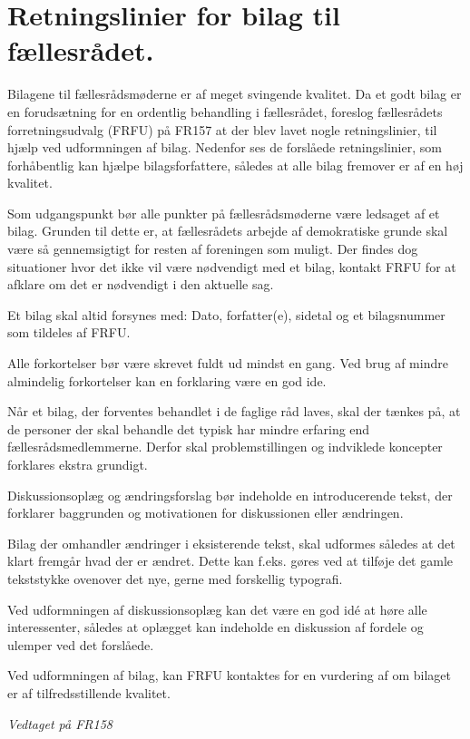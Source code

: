 \section{Retningslinier for bilag til fællesrådet.}

Bilagene til fællesrådsmøderne er af meget svingende kvalitet. Da et godt bilag er en forudsætning for en ordentlig
behandling i fællesrådet, foreslog fællesrådets forretningsudvalg (FRFU) på FR157 at der blev lavet nogle
retningslinier, til hjælp ved udformningen af bilag. Nedenfor ses de forslåede retningslinier, som forhåbentlig kan
hjælpe bilagsforfattere, således at alle bilag fremover er af en høj kvalitet.

\begin{list}{•}
\item Som udgangspunkt bør alle punkter på fællesrådsmøderne være ledsaget af et bilag. Grunden til dette er, at
fællesrådets arbejde af demokratiske grunde skal være så gennemsigtigt for resten af foreningen som muligt.
Der findes dog situationer hvor det ikke vil være nødvendigt med et bilag, kontakt FRFU for at afklare om det
er nødvendigt i den aktuelle sag.
\item Et bilag skal altid forsynes med: Dato, forfatter(e), sidetal og et bilagsnummer som tildeles af FRFU.
\item Alle forkortelser bør være skrevet fuldt ud mindst en gang. Ved brug af mindre almindelig forkortelser kan en
forklaring være en god ide.
\item Når et bilag, der forventes behandlet i de faglige råd laves, skal der tænkes på, at de personer der skal behandle
det typisk har mindre erfaring end fællesrådsmedlemmerne. Derfor skal problemstillingen og indviklede
koncepter forklares ekstra grundigt.
\item Diskussionsoplæg og ændringsforslag bør indeholde en introducerende tekst, der forklarer baggrunden og
motivationen for diskussionen eller ændringen.
\item Bilag der omhandler ændringer i eksisterende tekst, skal udformes således at det klart fremgår hvad der er
ændret. Dette kan f.eks. gøres ved at tilføje det gamle tekststykke ovenover det nye, gerne med forskellig
typografi.
\item Ved udformningen af diskussionsoplæg kan det være en god idé at høre alle interessenter, således at oplægget
kan indeholde en diskussion af fordele og ulemper ved det forslåede.
\item Ved udformningen af bilag, kan FRFU kontaktes for en vurdering af om bilaget er af tilfredsstillende kvalitet.
\end{list}

\textit{Vedtaget på FR158}
